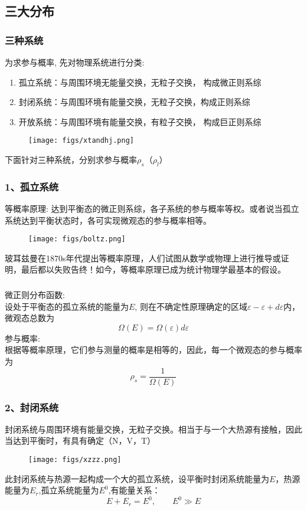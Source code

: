 \subsection{三大分布}

\begin{frame}
  \frametitle{三种系统}
  为求参与概率, 先对物理系统进行分类:
\begin{enumerate}
  \item 孤立系统：与周围环境无能量交换，无粒子交换， 构成微正则系综  
  \item 封闭系统：与周围环境有能量交换，无粒子交换，构成正则系综 
  \item 开放系统：与周围环境有能量交换，有粒子交换， 构成巨正则系综 
\end{enumerate}
\begin{figure}[htbp]
  \centering
  \texttt{[image: figs/xtandhj.png]}
\end{figure}
下面针对三种系统，分别求参与概率$\rho _s$（$\rho _l$）
\end{frame} 

\begin{frame}
  \frametitle{ 1、孤立系统}
  \alert{等概率原理:}  达到平衡态的微正则系综，各子系统的参与概率等权。或者说当孤立系统达到平衡状态时，各可实现微观态的参与概率相等。
  \begin{figure}[htbp]
    \centering
    \texttt{[image: figs/boltz.png]}
  \end{figure}
  玻耳兹曼在1870s年代提出等概率原理，人们试图从数学或物理上进行推导或证明，最后都以失败告终！如今，等概率原理已成为统计物理学最基本的假设。
\end{frame} 


\begin{frame}
  \frametitle{}
  \alert{微正则分布函数:} \\ 
  设处于平衡态的孤立系统的能量为$E$, 则在不确定性原理确定的区域$\varepsilon - \varepsilon+ d\varepsilon $内，微观态总数为
  $$
  \Omega(E) = \Omega(\varepsilon)  d \varepsilon 
  $$ 
  \alert{参与概率:} \\
  根据等概率原理，它们参与测量的概率是相等的，因此，每一个微观态的参与概率为
  \begin{equation}
    \boxed{\rho _s = \frac{1}{\Omega(E)}}
  \end{equation}
\end{frame} 

\begin{frame}
  \frametitle{ 2、封闭系统}
  封闭系统与周围环境有能量交换，无粒子交换。相当于与一个大热源有接触，因此当达到平衡时，有具有确定（N，V，T）
  \begin{figure}[htbp]
    \centering
    \texttt{[image: figs/xzzz.png]}
  \end{figure}
  此封闭系统与热源一起构成一个大的孤立系统，设平衡时封闭系统能量为$E$，热源能量为$E_r$,孤立系统能量为$E^0$,有能量关系：
  \[ E + E_r = E^0, \qquad E^0 \gg E\] 
\end{frame} 

